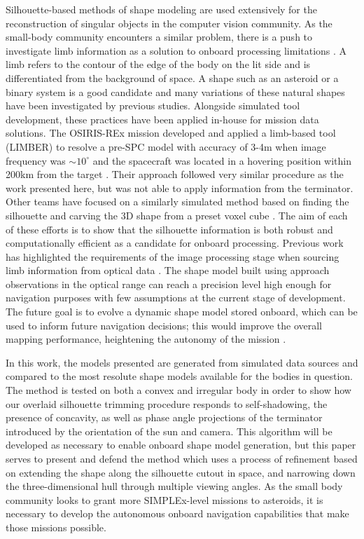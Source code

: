 Silhouette-based methods of shape modeling are used extensively for the reconstruction of singular objects in the computer vision community\citep{Franco2009}\citep{Matusik2000}\citep{Boyer2003}. As the small-body community encounters a similar problem, there is a push to investigate limb information as a solution to onboard processing limitations \citep{Panicucci2020}\citep{Liounis}. A limb refers to the contour of the edge of the body on the lit side and is differentiated from the background of space. A shape such as an asteroid or a binary system is a good candidate and many variations of these natural shapes have been investigated by previous studies. Alongside simulated tool development, these practices have been applied in-house for mission data solutions. The OSIRIS-REx mission developed and applied a limb-based tool (LIMBER) to resolve a pre-SPC model with accuracy of 3-4m when image frequency was $\sim10^{\circ}$ and the spacecraft was located in a hovering position within 200km from the target \citep{Palmer2019}. Their approach followed very similar procedure as the work presented here, but was not able to apply information from the terminator. Other teams have focused on a similarly simulated method based on finding the silhouette and carving the 3D shape from a preset voxel cube \citep{Bandyonadhyay2019}. The aim of each of these efforts is to show that the silhouette information is both robust and computationally efficient as a candidate for onboard processing. Previous work has highlighted the requirements of the image processing stage when sourcing limb information from optical data \citep{Li2013}. The shape model built using approach observations in the optical range can reach a precision level high enough for navigation purposes with few assumptions at the current stage of development. The future goal is to evolve a dynamic shape model stored onboard, which can be used to inform future navigation decisions; this would improve the overall mapping performance, heightening the autonomy of the mission \citep{Pesce2018}.  


In this work, the models presented are generated from simulated data sources and compared to the most resolute shape models available for the bodies in question. The method is tested on both a convex and irregular body in order to show how our overlaid silhouette trimming procedure responds to self-shadowing, the presence of concavity, as well as phase angle projections of the terminator introduced by the orientation of the sun and camera. This algorithm will be developed as necessary to enable onboard shape model generation, but this paper serves to present and defend the method which uses a process of refinement based on extending the shape along the silhouette cutout in space, and narrowing down the three-dimensional hull through multiple viewing angles. As the small body community looks to grant more SIMPLEx-level missions to asteroids,  it is necessary to develop the autonomous onboard navigation capabilities that make those missions possible. 


